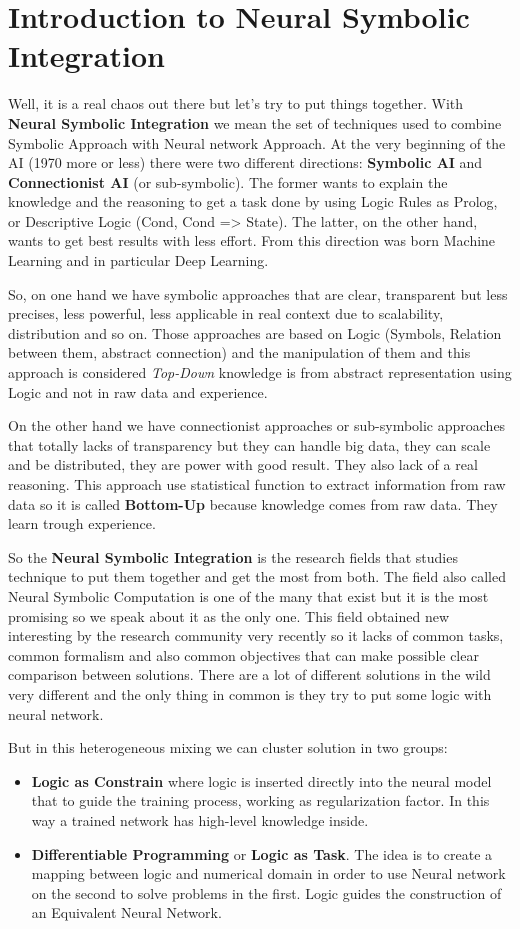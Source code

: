 \section{Introduction to Neural Symbolic Integration}
Well, it is a real chaos out there but let's try to put things together. With \textbf{Neural Symbolic Integration} we mean the set of techniques used to combine Symbolic Approach with Neural network Approach. At the very beginning of the AI (1970 more or less) there were two different directions: \textbf{Symbolic AI} and \textbf{Connectionist AI} (or sub-symbolic). The former wants to explain the knowledge and the reasoning to get a task done by using Logic Rules as Prolog, or Descriptive Logic (Cond, Cond => State). The latter, on the other hand, wants to get best results with less effort. From this direction was born Machine Learning and in particular Deep Learning.

So, on one hand we have symbolic approaches that are clear, transparent but less precises, less powerful, less applicable in real context due to scalability, distribution and so on. Those approaches are based on Logic (Symbols, Relation between them, abstract connection) and the manipulation of them and this approach is considered \textit{Top-Down} knowledge is from abstract representation using Logic and not in raw data and experience.

 On the other hand we have connectionist approaches or sub-symbolic approaches that totally lacks of transparency but they can handle big data, they can scale and be distributed, they are power with good result. They also lack of a real reasoning. This approach use statistical function to extract information from raw data so it is called \textbf{Bottom-Up} because knowledge comes from raw data. They learn trough experience.

So the \textbf{Neural Symbolic Integration} is the research fields that studies technique to put them together and get the most from both. The field also called Neural Symbolic Computation is one of the many that exist but it is the most promising so we speak about it as the only one. This field obtained new interesting by the research community very recently so it lacks of common tasks, common formalism and also common objectives that can make possible clear comparison between solutions. There are a lot of different solutions in the wild very different and the only thing in common is they try to put some logic with neural network.

But in this heterogeneous mixing we can cluster solution in two groups:
\begin{itemize}
  \item  \textbf{Logic as Constrain} where logic is inserted directly into the neural model that to guide the training process, working as regularization factor. In this way a trained network has high-level knowledge inside.
  \item \textbf{Differentiable Programming} or \textbf{Logic as Task}. The idea is to create a mapping between logic and numerical domain in order to use Neural network on the second to solve problems in the first. Logic guides the construction of an Equivalent Neural Network. 
  \end{itemize}  


